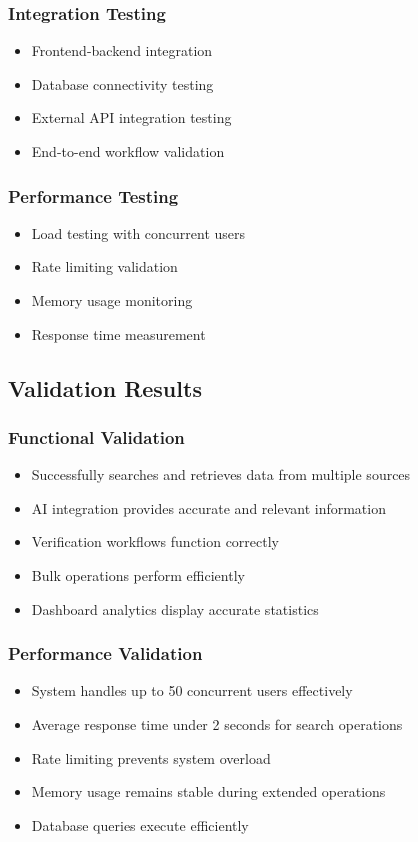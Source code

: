 \documentclass[12pt,a4paper]{article}
\begin{document}
\subsubsection{Integration Testing}
\begin{itemize}
    \item Frontend-backend integration
    \item Database connectivity testing
    \item External API integration testing
    \item End-to-end workflow validation
\end{itemize}

\subsubsection{Performance Testing}
\begin{itemize}
    \item Load testing with concurrent users
    \item Rate limiting validation
    \item Memory usage monitoring
    \item Response time measurement
\end{itemize}

\subsection{Validation Results}

\subsubsection{Functional Validation}
\begin{itemize}
    \item Successfully searches and retrieves data from multiple sources
    \item AI integration provides accurate and relevant information
    \item Verification workflows function correctly
    \item Bulk operations perform efficiently
    \item Dashboard analytics display accurate statistics
\end{itemize}

\subsubsection{Performance Validation}
\begin{itemize}
    \item System handles up to 50 concurrent users effectively
    \item Average response time under 2 seconds for search operations
    \item Rate limiting prevents system overload
    \item Memory usage remains stable during extended operations
    \item Database queries execute efficiently
\end{itemize}
\end{document}
